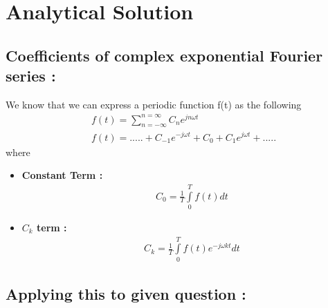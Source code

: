 
\chapter{Analytical Solution} %

\label{Chapter1}



\section{Coefficients of complex exponential Fourier series :} 
We know that we can express a periodic function f(t) as the following 
\begin{align*}
&f(t) = \sum\limits_{n=-\infty}^{n=\infty} C_n e^{j n\omega t} \\
&f(t) = .....+C_{-1}e^{-j\omega t} + C_0 + C_1e^{j\omega t}+.....
\end{align*}
where
\begin{itemize}
\item \textbf{Constant Term :} 
\begin{align*}
&\boxed{C_0 = \frac{1}{T}\int\limits_0^T f(t) dt}
\end{align*}
\item \textbf{$C_k$ term :} 
\begin{align*}
&\boxed{C_k = \frac{1}{T}\int\limits_0^Tf(t)e^{-j\omega kt}dt}
\end{align*}
\end{itemize}
\section{Applying this to given question :} 

